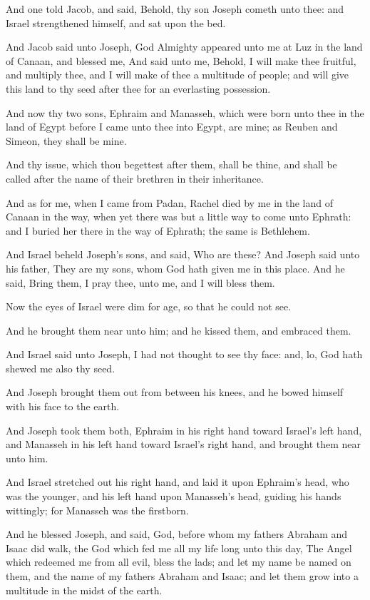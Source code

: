 \verse And one told Jacob, and said, Behold, thy son Joseph cometh unto thee: and Israel strengthened himself, and sat upon the bed.

\verse And Jacob said unto Joseph, God Almighty appeared unto me at Luz in the land of Canaan, and blessed me, \verse And said unto me, Behold, I will make thee fruitful, and multiply thee, and I will make of thee a multitude of people; and will give this land to thy seed after thee for an everlasting possession.

\verse And now thy two sons, Ephraim and Manasseh, which were born unto thee in the land of Egypt before I came unto thee into Egypt, are mine; as Reuben and Simeon, they shall be mine.

\verse And thy issue, which thou begettest after them, shall be thine, and shall be called after the name of their brethren in their inheritance.

\verse And as for me, when I came from Padan, Rachel died by me in the land of Canaan in the way, when yet there was but a little way to come unto Ephrath: and I buried her there in the way of Ephrath; the same is Bethlehem.

\verse And Israel beheld Joseph's sons, and said, Who are these?  \verse And Joseph said unto his father, They are my sons, whom God hath given me in this place. And he said, Bring them, I pray thee, unto me, and I will bless them.

\verse Now the eyes of Israel were dim for age, so that he could not see.

And he brought them near unto him; and he kissed them, and embraced them.

\verse And Israel said unto Joseph, I had not thought to see thy face: and, lo, God hath shewed me also thy seed.

\verse And Joseph brought them out from between his knees, and he bowed himself with his face to the earth.

\verse And Joseph took them both, Ephraim in his right hand toward Israel's left hand, and Manasseh in his left hand toward Israel's right hand, and brought them near unto him.

\verse And Israel stretched out his right hand, and laid it upon Ephraim's head, who was the younger, and his left hand upon Manasseh's head, guiding his hands wittingly; for Manasseh was the firstborn.

\verse And he blessed Joseph, and said, God, before whom my fathers Abraham and Isaac did walk, the God which fed me all my life long unto this day, \verse The Angel which redeemed me from all evil, bless the lads; and let my name be named on them, and the name of my fathers Abraham and Isaac; and let them grow into a multitude in the midst of the earth.

